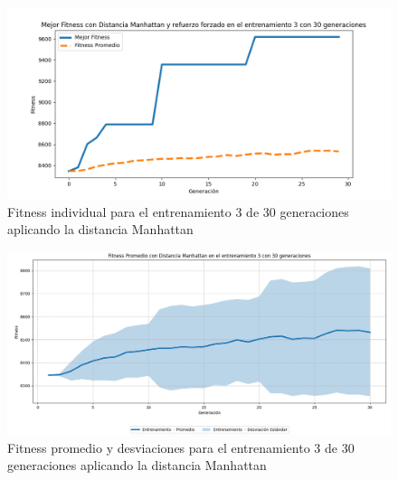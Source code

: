 \documentclass[lettersize, journal]{IEEEtran}
\begin{document}

\begin{figure}[H]
    \centering
    \includegraphics[width=0.9 \linewidth]{Manhattan/Fitness_individual_30Gen/Fitness_3_Mahn_30Gen.png}
    \caption{Fitness individual para el entrenamiento 3 de 30 generaciones aplicando la distancia Manhattan}
    \label{fig:manhattan_3_30}
\end{figure}
\begin{figure}[H]
    \centering
    \includegraphics[width=0.9 \linewidth]{Manhattan/Fitness_individual_30Gen/Fitness_3_Mahn_30Gen_Sombra.png}
    \caption{Fitness promedio y desviaciones para el entrenamiento 3 de 30 generaciones aplicando la distancia Manhattan}
    \label{fig:manhattan_3_30_sombra}
\end{figure}
\end{document}
